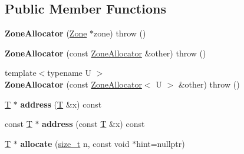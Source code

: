 \subsection*{Public Member Functions}
\begin{DoxyCompactItemize}
\item 
\mbox{\label{classv8_1_1internal_1_1ZoneAllocator_aa18da5937e907ca24335c1695432df5d}} 
{\bfseries Zone\+Allocator} (\mbox{\hyperlink{classv8_1_1internal_1_1Zone}{Zone}} $\ast$zone)  throw ()
\item 
\mbox{\label{classv8_1_1internal_1_1ZoneAllocator_aef360fa9708570b7b55c4963cdad772b}} 
{\bfseries Zone\+Allocator} (const \mbox{\hyperlink{classv8_1_1internal_1_1ZoneAllocator}{Zone\+Allocator}} \&other)  throw ()
\item 
\mbox{\label{classv8_1_1internal_1_1ZoneAllocator_a477e072add97bb5904aedb4e620d20bd}} 
{\footnotesize template$<$typename U $>$ }\\{\bfseries Zone\+Allocator} (const \mbox{\hyperlink{classv8_1_1internal_1_1ZoneAllocator}{Zone\+Allocator}}$<$ U $>$ \&other)  throw ()
\item 
\mbox{\label{classv8_1_1internal_1_1ZoneAllocator_a9eede71bca224b41de2b9c7b5903ae8c}} 
\mbox{\hyperlink{classv8_1_1internal_1_1torque_1_1T}{T}} $\ast$ {\bfseries address} (\mbox{\hyperlink{classv8_1_1internal_1_1torque_1_1T}{T}} \&x) const
\item 
\mbox{\label{classv8_1_1internal_1_1ZoneAllocator_a102d5294d8b6ed1b61c5eb27ead93829}} 
const \mbox{\hyperlink{classv8_1_1internal_1_1torque_1_1T}{T}} $\ast$ {\bfseries address} (const \mbox{\hyperlink{classv8_1_1internal_1_1torque_1_1T}{T}} \&x) const
\item 
\mbox{\label{classv8_1_1internal_1_1ZoneAllocator_a96f29f0a2d8e4e375433d20326897c8f}} 
\mbox{\hyperlink{classv8_1_1internal_1_1torque_1_1T}{T}} $\ast$ {\bfseries allocate} (\mbox{\hyperlink{classsize__t}{size\+\_\+t}} n, const void $\ast$hint=nullptr)
\item 
\mbox{\label{classv8_1_1internal_1_1ZoneAllocator_a656a2c49bbc20598115e703fa54515d4}} 

\end{DoxyCompactItemize}

